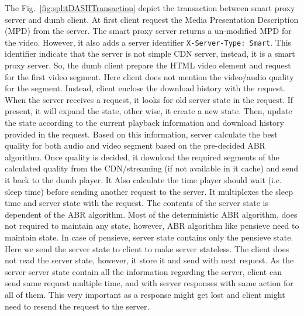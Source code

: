 The Fig.~\ref{fig:splitDASHTransaction} depict the transaction between smart proxy server and dumb client. At first client request the Media Presentation Description (MPD) from the server. The smart proxy server returns a un-modified MPD for the video. However, it also adds a server identifier {\tt X-Server-Type: Smart}. This identifier indicate that the server is not simple CDN server, instead, it is a smart proxy server. So, the dumb client prepare the HTML video element and request for the first video segment. Here client does not mention the video/audio quality for the segment. Instead, client enclose the download history with the request. When the server receives a request, it looks for old server state in the request. If present, it will expand the state, other wise, it create a new state. Then, update the state according to the current playback information and download history provided in the request. Based on this information, server calculate the best quality for both audio and video segment based on the pre-decided ABR algorithm. Once quality is decided, it download the required segments of the calculated quality from the CDN/streaming (if not available in it cache) and send it back to the dumb player. It Also calculate the time player should wait (i.e. sleep time) before sending another request to the server. It multiplexes the sleep time and server state with the request. The contents of the server state is dependent of the ABR algorithm. Most of the deterministic ABR algorithm, does not required to maintain any state, however, ABR algorithm like pensieve need to maintain state. In case of pensieve, server state contains only the pensieve state.
Here we send the server state to client to make server stateless. The client does not read the server state, however, it store it and send with next request. As the server server state contain all the information regarding the server, client can send same request multiple time, and with server responses with same action for all of them. This very important as a response might get lost and client might need to resend the request to the server.



